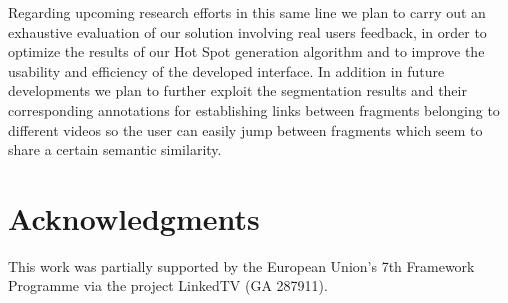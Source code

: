 \documentclass{llncs}
\begin{document}
Regarding upcoming research efforts in this same line  we plan to carry out an exhaustive evaluation of our solution involving real users feedback, in order to optimize the results of our Hot Spot generation algorithm and to improve the usability and efficiency of the developed interface. In addition in future developments we plan to further exploit the segmentation results and their corresponding annotations for establishing links between fragments belonging to different videos so the user can easily jump between fragments which seem to share a certain semantic similarity.


\section*{Acknowledgments}
This work was partially supported by the European Union's 7th Framework Programme via the project LinkedTV (GA 287911).



\end{document}
